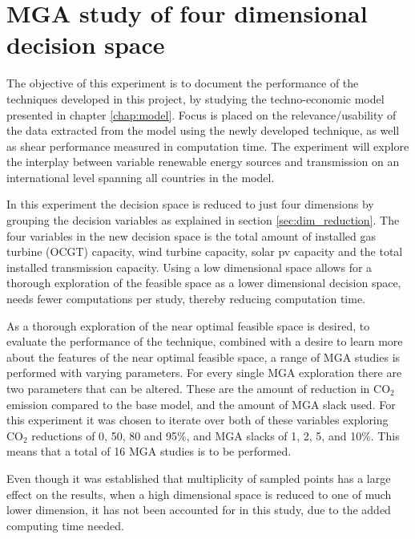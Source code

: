 \section{MGA study of four dimensional decision space}\label{sec:4D}
The objective of this experiment is to document the performance of the techniques developed in this project, by studying the techno-economic model presented in chapter \ref{chap:model}. Focus is placed on the relevance/usability of the data extracted from the model using the newly developed technique, as well as shear performance measured in computation time. The experiment will explore the interplay between variable renewable energy sources and transmission on an international level spanning all countries in the model. 

In this experiment the decision space is reduced to just four dimensions by grouping the decision variables as explained in section \ref{sec:dim_reduction}. The four variables in the new decision space is the total amount of installed gas turbine (OCGT) capacity, wind turbine capacity, solar pv capacity and the total installed transmission capacity. Using a low dimensional space allows for a thorough exploration of the feasible space as a lower dimensional decision space, needs fewer computations per study, thereby reducing computation time. 

As a thorough exploration of the near optimal feasible space is desired, to evaluate the performance of the technique, combined with a desire to learn more about the features of the near optimal feasible space, a range of MGA studies is performed with varying parameters. 
For every single MGA exploration there are two parameters that can be altered. These are the amount of reduction in $\text{CO}_2$ emission compared to the base model, and the amount of MGA slack used. For this experiment it was chosen to iterate over both of these variables exploring $\text{CO}_2$ reductions of 0, 50, 80 and 95\%, and MGA slacks of 1, 2, 5, and 10\%. This means that a total of 16 MGA studies is to be performed. 

Even though it was established that multiplicity of sampled points has a large effect on the results, when a high dimensional space is reduced to one of much lower dimension, it has not been accounted for in this study, due to the added computing time needed. 



